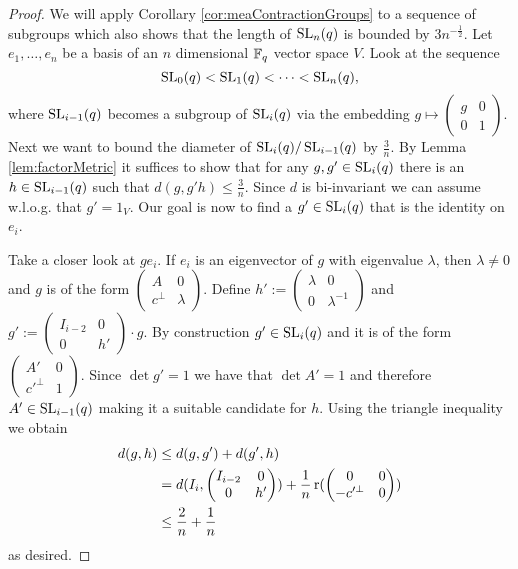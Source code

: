 \begin{proof}
We will apply Corollary \ref{cor:meaContractionGroups} to a sequence of subgroups which also shows that the length of  $\operatorname{SL}_n(q)$ is bounded by $3n^{-\frac{1}{2}}$.
Let $e_1,\dots,e_n$ be a basis of an $n$ dimensional $\mathbb{F}_q$ vector space $V$. Look at the sequence
\[\operatorname{SL}_0(q)<\operatorname{SL}_1(q)<\dots<\operatorname{SL}_n(q),\]
where $\operatorname{SL}_{i-1}(q)$ becomes a subgroup of $\operatorname{SL}_i(q)$ via the embedding $g\mapsto 
\begin{pmatrix}
g&0\\
0&1
\end{pmatrix}$. Next we want to bound the diameter of $\operatorname{SL}_{i}(q)/\operatorname{SL}_{i-1}(q)$ by $\frac{3}{n}$. By Lemma \ref{lem:factorMetric} it suffices to show that for any $g,g'\in\operatorname{SL}_i(q)$ there is an $h\in \operatorname{SL}_{i-1}(q)$ such that $d(g,g'h)\leq\frac{3}{n}$. Since $d$ is bi-invariant we can assume w.l.o.g. that $g'=1_V$. 
Our goal is now to find a $g'\in\operatorname{SL}_i(q)$ that is the identity on $e_i$.

Take a closer look at $ge_i$. If $e_i$ is an eigenvector of $g$ with eigenvalue $\lambda$, then $\lambda\not=0$ and $g$ is of the form 
$\begin{pmatrix}
A&0\\
c^\bot&\lambda
\end{pmatrix}$.
Define $h':=
\begin{pmatrix}
\lambda&0\\
0&\lambda^{-1}
\end{pmatrix}
$
and $g':=
\begin{pmatrix}
I_{i-2}&0\\
0&h'
\end{pmatrix}\cdot g$.
By construction $g'\in\operatorname{SL}_i(q)$ and it is of the form 
$\begin{pmatrix}
A'&0\\
c'^\bot&1
\end{pmatrix}$. Since $\det g'=1$ we have that $\det A'=1$ and therefore $A'\in\operatorname{SL}_{i-1}(q)$ making it a suitable candidate for $h$. Using the triangle inequality we obtain
\begin{align*}
d(g,h)&\leq d(g,g')+d(g',h)\\
&=d(I_i,\begin{pmatrix}
I_{i-2}&0\\
0&h'
\end{pmatrix})+\frac{1}{n}\operatorname{r}(\begin{pmatrix}
0&0\\
-c'^\bot&0
\end{pmatrix})\\
&\leq \frac{2}{n}+ \frac{1}{n}
\end{align*}
as desired.


\end{proof}
